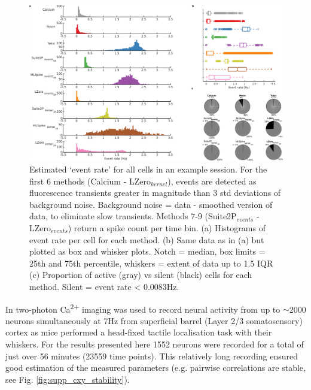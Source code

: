\documentclass[a4paper,10pt,twocolumn]{article}
\begin{document}
\begin{figure}
\includegraphics[width=\textwidth]{full_figs_19v2/why_deconvolve_F3_19v2.png}
\caption{\label{fig:simple_stats} Estimated `event rate' for all cells in an example session. For the first 6 methods (Calcium - LZero$_{kernel}$), events are detected as fluorescence transients greater in magnitude than 3 std deviations of background noise. Background noise = data - smoothed version of data, to eliminate slow transients. Methods 7-9 (Suite2P$_{events}$ - LZero$_{events}$) return a spike count per time bin. (a) Histograms of event rate per cell for each method. (b) Same data as in (a) but plotted as box and whisker plots. Notch = median, box limits = 25th and 75th percentile, whiskers = extent of data up to 1.5 IQR (c) Proportion of active (gray) vs silent (black) cells for each method. Silent = event rate < 0.0083Hz.}
\end{figure}

In \citealt{Peron2015-qz} two-photon Ca\textsuperscript{2+} imaging was used to record neural activity from up to $\sim$2000 neurons simultaneously at 7Hz from superficial barrel (Layer 2/3 somatosensory) cortex as mice performed a head-fixed tactile localisation task with their whiskers. For the results presented here 1552 neurons were recorded for a total of just over 56 minutes (23559 time points). This relatively long recording ensured good estimation of the measured parameters (e.g. pairwise correlations are stable, see Fig. \ref{fig:supp_cxy_stability}).


\end{document}

